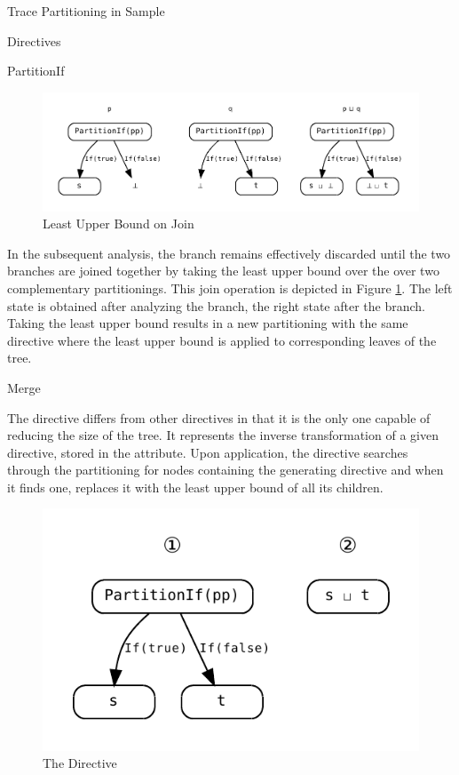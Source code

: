 \begin{chapter}{Trace Partitioning in Sample}
\begin{section}{Directives}
\begin{subsection}{PartitionIf}
			\begin{figure}
				\centering
				\includegraphics[width=\textwidth]{Graphs/PartitionIf_lub.pdf}
				\caption{Least Upper Bound on Join}
				\label{figure:PartitionIf::lub}
			\end{figure}

			In the subsequent analysis, the  branch remains effectively discarded until the two branches are joined together by taking the least upper bound over the over two complementary partitionings. This join operation is depicted in Figure \ref{figure:PartitionIf::lub}. The left state  is obtained after analyzing the  branch, the right state  after the  branch. Taking the least upper bound results in a new partitioning with the same directive where the least upper bound is applied to corresponding leaves of the tree.

		\end{subsection}


		\begin{subsection}{Merge}
			\label{subsection:Merge}

			The  directive differs from other directives in that it is the only one capable of reducing the size of the tree. It represents the inverse transformation of a given directive, stored in the  attribute. Upon application, the directive searches through the partitioning for nodes containing the generating directive and when it finds one, replaces it with the least upper bound of all its children.

			\begin{figure}[h]
				\centering
				\includegraphics[]{Graphs/Merge.pdf}
				\caption{The  Directive}
				\label{figure:Merge}
			\end{figure}


\end{subsection}
\end{section}
\end{chapter}
